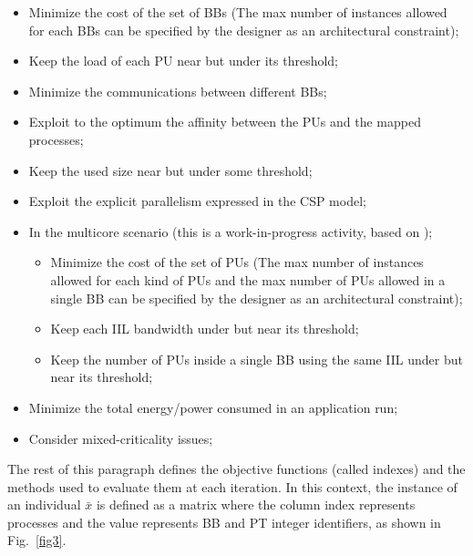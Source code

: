 \begin{itemize}
    \item Minimize the cost of the set of BBs (The max number of instances allowed for each BBs can be specified by the designer as an architectural constraint);
    \item Keep the load of each PU near but under its threshold;
    \item Minimize the communications between different BBs;
    \item Exploit to the optimum the affinity between the PUs and the mapped processes;
    \item Keep the used size near but under some threshold;
    \item Exploit the explicit parallelism expressed in the CSP model;
    \item In the multicore scenario (this is a work-in-progress activity, based on \cite{bib26});
    \begin{itemize}
        \item Minimize the cost of the set of PUs (The max number of instances allowed for each kind of PUs and the max number of PUs allowed in a single BB can be specified by the designer as an architectural constraint);
        \item Keep each IIL bandwidth under but near its threshold;
        \item Keep the number of PUs inside a single BB using the same IIL under but near its threshold;
    \end{itemize}
    \item Minimize the total energy/power consumed in an application run;
    \item Consider mixed-criticality issues;
\end{itemize}
%
The rest of this paragraph defines the objective functions (called indexes) and the methods used to evaluate them at each iteration. In this context, the instance of an individual \textit{$\bar x$} is defined as a matrix where the column index represents processes and the value represents BB and PT integer identifiers, as shown in Fig.~\ref{fig3}. \par
%
